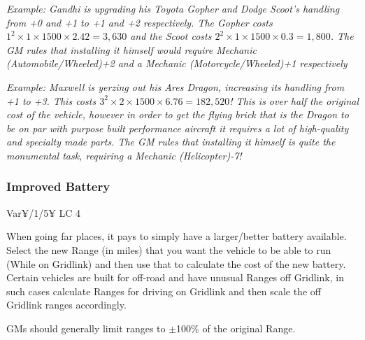 \begin{multicols*}{2}


	\textcolor{OliveGreen}{\textit{Example: Gandhi is upgrading his Toyota Gopher and Dodge Scoot's handling from +0 and +1 to +1 and +2 respectively. The Gopher costs $1^2 \times 1 \times 1500 \times 2.42 = 3,630$ and the Scoot costs $2^2 \times 1 \times 1500 \times 0.3 = 1,800$. The GM rules that installing it himself would require Mechanic (Automobile/Wheeled)+2 and a Mechanic (Motorcycle/Wheeled)+1 respectively}}
	
	\textcolor{OliveGreen}{\textit{Example: Maxwell is yerzing out his Ares Dragon, increasing its handling from +1 to +3. This costs $3^2 \times 2 \times 1500 \times 6.76 = 182,520$! This is over half the original cost of the vehicle, however in order to get the flying brick that is the Dragon to be on par with purpose built performance aircraft it requires a \textit{lot} of high-quality and specialty made parts. The GM rules that installing it himself is quite the monumental task, requiring a Mechanic (Helicopter)-7!}}
	
	\subsubsection{Improved Battery}
	Var¥/1/5¥ LC 4
	
	When going far places, it pays to simply have a larger/better battery available. Select the new Range (in miles) that you want the vehicle to be able to run (While on Gridlink) and then use that to calculate the cost of the new battery. Certain vehicles are built for off-road and have unusual Ranges off Gridlink, in such cases calculate Ranges for driving on Gridlink and then scale the off Gridlink ranges accordingly.
	
	GMs should generally limit ranges to $\pm$100\% of the original Range.
	


\end{multicols*}
